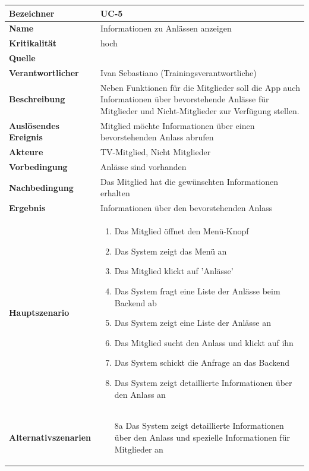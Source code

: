 \begin{table}[ht]
\centering
  \begin{tabular}{ l | p{10cm} }
	\hline
	\rowcolor{gray}
	\textbf{Bezeichner}		&	\textbf{UC-5}\\ \hline
	\textbf{Name}			&	Informationen zu Anlässen anzeigen\\ \hline
	\textbf{Kritikalität}		&	hoch\\ \hline
	\textbf{Quelle}			&	\glossarmark{Stakeholder}\\ \hline
	\textbf{Verantwortlicher}	&	Ivan Sebastiano (Trainingsverantwortliche)\\ \hline
	\textbf{Beschreibung}	&	Neben Funktionen für die Mitglieder soll die App auch Informationen über bevorstehende Anlässe für Mitglieder und Nicht-Mitglieder zur Verfügung stellen.\\ \hline
	\textbf{Auslösendes Ereignis}&	Mitglied möchte Informationen über einen bevorstehenden Anlass abrufen\\ \hline
	\textbf{Akteure}		&	TV-Mitglied, Nicht Mitglieder\\ \hline
	\textbf{Vorbedingung}	&	Anlässe sind vorhanden\\ \hline
	\textbf{Nachbedingung}	&	Das Mitglied hat die gewünschten Informationen erhalten\\ \hline
	\textbf{Ergebnis}		&	Informationen über den bevorstehenden Anlass\\ \hline
	\textbf{Hauptszenario}	&	\begin{enumerate}
					\item Das Mitglied öffnet den Menü-Knopf
					\item Das System zeigt das Menü an
					\item Das Mitglied klickt auf 'Anlässe'
					\item Das System fragt eine Liste der Anlässe beim Backend ab
					\item Das System zeigt eine Liste der Anlässe an
					\item Das Mitglied sucht den Anlass und klickt auf ihn
					\item Das System schickt die Anfrage an das Backend
					\item Das System zeigt detaillierte Informationen über den Anlass an
					\end{enumerate}
					\\ \hline
	\textbf{Alternativszenarien}	&	\begin{enumerate}
					\item[8a] Das System zeigt detaillierte Informationen über den Anlass und spezielle Informationen für Mitglieder an

\end{enumerate}
\end{tabular}
\end{table}
